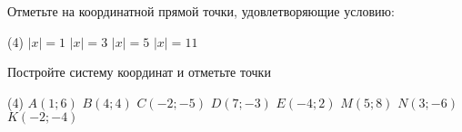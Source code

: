 \begin{homework}[number=1]
\begin{listofex}
		\item Отметьте на координатной прямой точки, удовлетворяющие условию:
		\begin{tasks}(4)
			\task \( |x|=1 \)
			\task \( |x|=3 \)
			\task \( |x|=5 \)
			\task \( |x|=11 \)
		\end{tasks}
		\item Постройте систему координат и отметьте точки
		\begin{tasks}(4)
			\task \( A(1;6) \)
			\task \( B(4;4) \)
			\task \( C(-2;-5) \)
			\task \( D(7;-3) \)
			\task \( E(-4;2) \)
			\task \( M(5;8) \)
			\task \( N(3;-6) \)
			\task \( K(-2;-4) \)
		\end{tasks}
	\end{listofex}
\end{homework}

